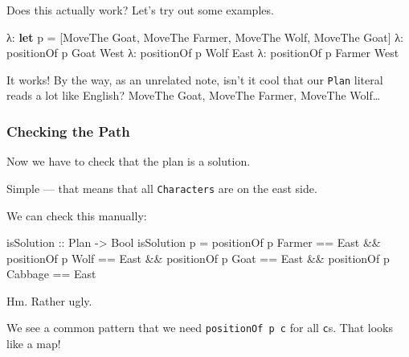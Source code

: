 \documentclass[]{article}
\newenvironment{Shaded}{}{}
\newcommand{\KeywordTok}[1]{\textcolor[rgb]{0.00,0.44,0.13}{\textbf{{#1}}}}
\newcommand{\DataTypeTok}[1]{\textcolor[rgb]{0.56,0.13,0.00}{{#1}}}
\newcommand{\OtherTok}[1]{\textcolor[rgb]{0.00,0.44,0.13}{{#1}}}
\newcommand{\FunctionTok}[1]{\textcolor[rgb]{0.02,0.16,0.49}{{#1}}}
\newcommand{\NormalTok}[1]{{#1}}
\begin{document}
Does this actually work? Let's try out some examples.

\begin{Shaded}
\begin{Highlighting}[]
\NormalTok{λ}\FunctionTok{:} \KeywordTok{let} \NormalTok{p }\FunctionTok{=} \NormalTok{[}\DataTypeTok{MoveThe} \DataTypeTok{Goat}\NormalTok{, }\DataTypeTok{MoveThe} \DataTypeTok{Farmer}\NormalTok{, }\DataTypeTok{MoveThe} \DataTypeTok{Wolf}\NormalTok{, }\DataTypeTok{MoveThe} \DataTypeTok{Goat}\NormalTok{]}
\NormalTok{λ}\FunctionTok{:} \NormalTok{positionOf p }\DataTypeTok{Goat}
\DataTypeTok{West}
\NormalTok{λ}\FunctionTok{:} \NormalTok{positionOf p }\DataTypeTok{Wolf}
\DataTypeTok{East}
\NormalTok{λ}\FunctionTok{:} \NormalTok{positionOf p }\DataTypeTok{Farmer}
\DataTypeTok{West}
\end{Highlighting}
\end{Shaded}

It works! By the way, as an unrelated note, isn't it cool that our \texttt{Plan}
literal reads a lot like English? MoveThe Goat, MoveThe Farmer, MoveThe
Wolf\ldots{}

\subsubsection{Checking the Path}\label{checking-the-path}

Now we have to check that the plan is a solution.

Simple --- that means that all \texttt{Characters} are on the east side.

We can check this manually:

\begin{Shaded}
\begin{Highlighting}[]
\OtherTok{isSolution ::} \DataTypeTok{Plan} \OtherTok{->} \DataTypeTok{Bool}
\NormalTok{isSolution p }\FunctionTok{=}
    \NormalTok{positionOf p }\DataTypeTok{Farmer} \FunctionTok{==} \DataTypeTok{East}
    \FunctionTok{&&} \NormalTok{positionOf p }\DataTypeTok{Wolf} \FunctionTok{==} \DataTypeTok{East}
    \FunctionTok{&&} \NormalTok{positionOf p }\DataTypeTok{Goat} \FunctionTok{==} \DataTypeTok{East}
    \FunctionTok{&&} \NormalTok{positionOf p }\DataTypeTok{Cabbage} \FunctionTok{==} \DataTypeTok{East}
\end{Highlighting}
\end{Shaded}

Hm. Rather ugly.

We see a common pattern that we need \texttt{positionOf\ p\ c} for all
\texttt{c}s. That looks like a map!
\end{document}
